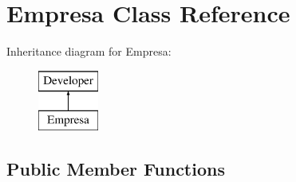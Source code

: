 \hypertarget{class_empresa}{\section{Empresa Class Reference}
\label{class_empresa}
}
Inheritance diagram for Empresa\+:\begin{figure}[H]
\begin{center}
\leavevmode
\includegraphics[height=2.000000cm]{class_empresa}
\end{center}
\end{figure}
\subsection*{Public Member Functions}
